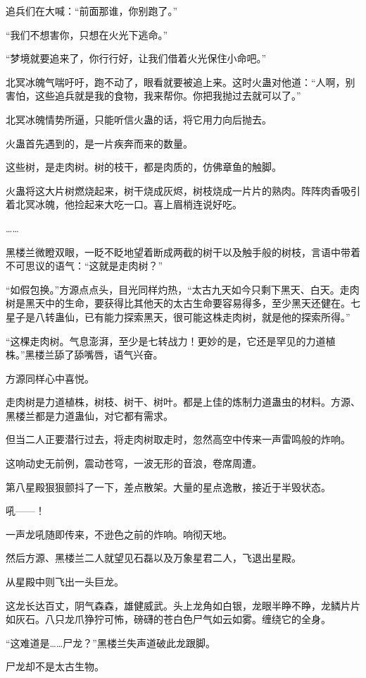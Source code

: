 \begin{this_body}
追兵们在大喊：“前面那谁，你别跑了。”

“我们不想害你，只想在火光下逃命。”

“梦境就要追来了，你行行好，让我们借着火光保住小命吧。”

北冥冰魄气喘吁吁，跑不动了，眼看就要被追上来。这时火蛊对他道：“人啊，别害怕，这些追兵就是我的食物，我来帮你。你把我抛过去就可以了。”

北冥冰魄情势所逼，只能听信火蛊的话，将它用力向后抛去。

火蛊首先遇到的，是一片疾奔而来的数量。

这些树，是走肉树。树的枝干，都是肉质的，仿佛章鱼的触脚。

火蛊将这大片树燃烧起来，树干烧成灰烬，树枝烧成一片片的熟肉。阵阵肉香吸引着北冥冰魄，他捡起来大吃一口。喜上眉梢连说好吃。

……

黑楼兰微瞪双眼，一眨不眨地望着断成两截的树干以及触手般的树枝，言语中带着不可思议的语气：“这就是走肉树？”

“如假包换。”方源点点头，目光同样灼热，“太古九天如今只剩下黑天、白天。走肉树是黑天中的生命，要获得比其他天的太古生命要容易得多，至少黑天还健在。七星子是八转蛊仙，已有能力探索黑天，很可能这株走肉树，就是他的探索所得。”

“这棵走肉树。气息澎湃，至少是七转战力！更妙的是，它还是罕见的力道植株。”黑楼兰舔了舔嘴唇，语气兴奋。

方源同样心中喜悦。

走肉树是力道植株，树枝、树干、树叶。都是上佳的炼制力道蛊虫的材料。方源、黑楼兰都是力道蛊仙，对它都有需求。

但当二人正要潜行过去，将走肉树取走时，忽然高空中传来一声雷鸣般的炸响。

这响动史无前例，震动苍穹，一波无形的音浪，卷席周遭。

第八星殿狠狠颤抖了一下，差点散架。大量的星点逸散，接近于半毁状态。

吼——！

一声龙吼随即传来，不逊色之前的炸响。响彻天地。

然后方源、黑楼兰二人就望见石磊以及万象星君二人，飞退出星殿。

从星殿中则飞出一头巨龙。

这龙长达百丈，阴气森森，雄健威武。头上龙角如白银，龙眼半睁不睁，龙鳞片片如灰石。八只龙爪狰狞可怖，磅礴的苍白色尸气如云如雾。缠绕它的全身。

“这难道是……尸龙？”黑楼兰失声道破此龙跟脚。

尸龙却不是太古生物。


\end{this_body}
